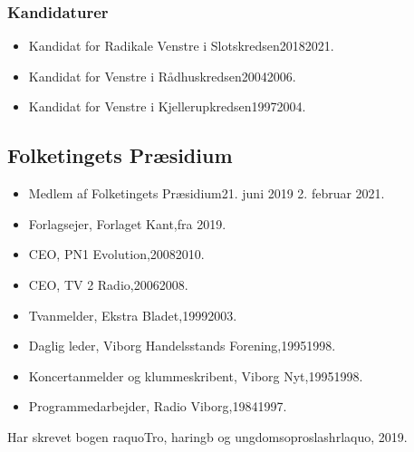 \documentclass[11pt, a4paper]{awesome-cv}
\begin{document}
\begin{cvletter}
\subsubsection*{Kandidaturer}
\begin{itemize}
\item Kandidat for Radikale Venstre i Slotskredsen20182021.
\item Kandidat for Venstre i Rådhuskredsen20042006.
\item Kandidat for Venstre i Kjellerupkredsen19972004.
\end{itemize}
\subsection*{Folketingets Præsidium}
\begin{itemize}
\item Medlem af Folketingets Præsidium21. juni 2019  2. februar 2021.
\end{itemize}
\begin{itemize}
\item Forlagsejer, Forlaget Kant,fra 2019.
\item CEO, PN1 Evolution,20082010.
\item CEO, TV 2 Radio,20062008.
\item Tvanmelder, Ekstra Bladet,19992003.
\item Daglig leder, Viborg Handelsstands Forening,19951998.
\item Koncertanmelder og klummeskribent, Viborg Nyt,19951998.
\item Programmedarbejder, Radio Viborg,19841997.
\end{itemize}
Har skrevet bogen raquoTro, haringb og ungdomsoproslashrlaquo, 2019.

\end{cvletter}
\end{document}
